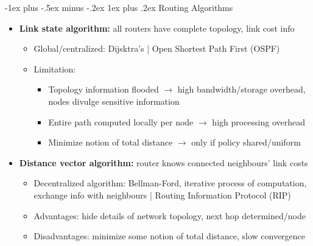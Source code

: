 \documentclass[10pt,landscape]{article}
\makeatletter
\newcommand{\subsubsubsection}{\@startsection{subsubsection}{3}{0mm}%
                                {-1ex plus -.5ex minus -.2ex}%
                                {1ex plus .2ex}%
                                {\normalfont\scriptsize\bfseries}}
\makeatother
\begin{document}
\begin{multicols*}{3}
\subsubsubsection{Routing Algorithms}
\begin{itemize}[topsep=0pt,noitemsep,wide=0pt, leftmargin=\dimexpr{} + 2\relax]
  \item \textbf{Link state algorithm:} all routers have complete topology, link cost info
  \begin{itemize}[topsep=0pt,noitemsep,wide=0pt, leftmargin=\dimexpr{} + 2\relax]
    \item Global/centralized: Dijsktra's | Open Shortest Path First (OSPF)
    \item Limitation:
    \begin{itemize}[topsep=0pt,noitemsep,wide=0pt, leftmargin=\dimexpr{} + 2\relax]
      \item Topology information flooded $\rightarrow$ high bandwidth/storage overhead, nodes divulge sensitive information
      \item Entire path computed locally per node $\rightarrow$ high processing overhead
      \item Minimize notion of total distance $\rightarrow$ only if policy shared/uniform
    \end{itemize}
  \end{itemize}
  \item \textbf{Distance vector algorithm:} router knows connected neighbours' link costs
  \begin{itemize}[topsep=0pt,noitemsep,wide=0pt, leftmargin=\dimexpr{} + 2\relax]
    \item Decentralized algorithm: Bellman-Ford, iterative process of computation, exchange info with neighbours | Routing Information Protocol (RIP)
    \item Advantages: hide details of network topology, next hop determined/node
    \item Disadvantages: minimize some notion of total distance, slow convergence
  \end{itemize}
\end{itemize}


\end{multicols*}
\end{document}
